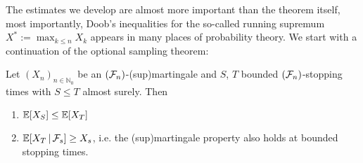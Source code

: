 
The estimates we develop are almost more important than the theorem itself, most importantly, Doob's inequalities for the so-called running supremum $X^*:=\max_{k\leq n} X_k$ appears in many places of probability theory. We start with a continuation of the optional sampling theorem:
\begin{llemma}
\begin{lemma}\label{lemma331}
	Let $(X_n)_{n\in\mathbb{N}_0}$ be an $(\mathcal{F}_n)$-(sup)martingale and $S$, $T$ bounded $(\mathcal{F}_n)$-stopping times with $S \leq T$ almost surely. Then
	\begin{enumerate}[label=(\roman*)]	
		\item
			$\mathbb{E}[X_S] \leq \mathbb{E}[X_T]$
		\item
			$\mathbb{E}[X_T\,|\,\mathcal{F}_s] \geq X_s$, i.e. the (sup)martingale property also holds at bounded stopping times.
	\end{enumerate}
\end{lemma}
\end{llemma}
